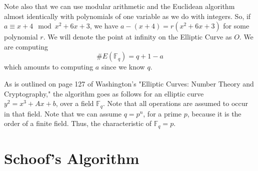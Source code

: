 \documentclass[11pt,reqno]{amsart}
\theoremstyle{definition}
\begin{document}
Note also that we can use modular arithmetic and the Euclidean algorithm almost identically with polynomials of one variable as we do with integers. So, if $a \equiv x+4 \mod x^2+6x+3$, we have $a - (x+4) = r(x^2+6x+3)$ for some polynomial $r$. We will denote the point at infinity on the Elliptic Curve as $O$. We are computing $$\#E(\mathbb{F}_q) = q + 1 - a$$ which amounts to computing $a$ since we know $q$. 

As is outlined on page 127 of \cite{Washington} Washington's "Elliptic Curves: Number Theory and Cryptography," the algorithm goes as follows for an elliptic curve $y^2 = x^3 + Ax + b$, over a field $\mathbb{F}_q$. Note that all operations are assumed to occur in that field. Note that we can assume $q = p^n$, for a prime $p$, because it is the order of a finite field. Thus, the characteristic of $\mathbb{F}_q = p$. 

\section{Schoof's Algorithm}
\end{document}
